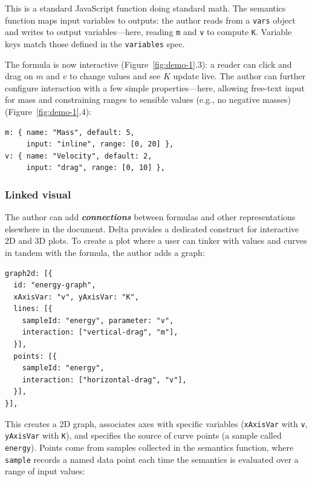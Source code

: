 This is a standard JavaScript function doing standard math. The semantics function maps input variables to outputs: the author reads from a \texttt{vars} object and writes to output variables---here, reading \texttt{m} and \texttt{v} to compute \texttt{K}. Variable keys match those defined in the \texttt{variables} spec.

The formula is now interactive (Figure~\ref{fig:demo-1}.3): a reader can click and drag on $m$ and $v$ to change values and see $K$ update live. The author can further configure interaction with a few simple properties---here, allowing free-text input for mass and constraining ranges to sensible values (e.g., no negative masses) (Figure~\ref{fig:demo-1}.4):

\begin{tcolorbox}[codebox]
\begin{lstlisting}[style=jsstyle]
m: { name: "Mass", default: 5, 
     input: "inline", range: [0, 20] },
v: { name: "Velocity", default: 2,
     input: "drag", range: [0, 10] },
\end{lstlisting}
\end{tcolorbox}

\subsubsection{Linked visual}
The author can add \textbf{\textit{connections}} between formulas and other representations elsewhere in the document. Delta provides a dedicated construct for interactive 2D and 3D plots. To create a plot where a user can tinker with values and curves in tandem with the formula, the author adds a graph:

\begin{tcolorbox}[codebox]
\begin{lstlisting}[style=jsstyle]
graph2d: [{
  id: "energy-graph",
  xAxisVar: "v", yAxisVar: "K",
  lines: [{
    sampleId: "energy", parameter: "v",
    interaction: ["vertical-drag", "m"],
  }],
  points: [{
    sampleId: "energy",
    interaction: ["horizontal-drag", "v"],
  }],
}],
\end{lstlisting}
\end{tcolorbox}

This creates a 2D graph, associates axes with specific variables (\texttt{xAxisVar} with \texttt{v}, \texttt{yAxisVar} with \texttt{K}), and specifies the source of curve points (a sample called \texttt{energy}). Points come from samples collected in the semantics function, where \texttt{sample} records a named data point each time the semantics is evaluated over a range of input values:

